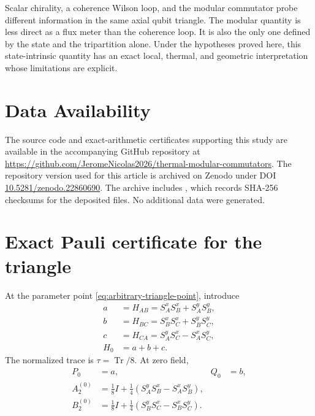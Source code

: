 \documentclass[11pt]{article}
\newcommand{\Tr}{\operatorname{Tr}}
\begin{document}
Scalar chirality, a coherence Wilson loop, and the modular commutator probe
different information in the same axial qubit triangle.  The modular quantity
is less direct as a flux meter than the coherence loop.  It is also the only
one defined by the state and the tripartition alone.  Under the hypotheses
proved here,
this state-intrinsic quantity has an exact local, thermal, and geometric
interpretation whose limitations are explicit.

\section*{Data Availability}

The source code and exact-arithmetic certificates supporting this study are
available in the accompanying GitHub repository at
\url{https://github.com/JeromeNicolas2026/thermal-modular-commutators}.
The repository version used for this article is archived on Zenodo under DOI
\href{https://doi.org/10.5281/zenodo.22860690}{10.5281/zenodo.22860690}.
The archive includes
, which records SHA-256 checksums for the deposited
files.  No additional data were generated.

\appendix

\section{Exact Pauli certificate for the triangle}
\label{app:pauli-certificate}

At the parameter point \eqref{eq:arbitrary-triangle-point}, introduce
\begin{align}
 a&=H_{AB}=S_A^xS_B^x+S_A^yS_B^y,
 \label{eq:a-def}\\
 b&=H_{BC}=S_B^xS_C^x+S_B^yS_C^y,
 \label{eq:b-def}\\
 c&=H_{CA}=S_A^yS_C^x-S_A^xS_C^y,
 \label{eq:c-def}\\
 H_0&=a+b+c.
 \label{eq:H0-def}
\end{align}
The normalized trace is $\tau=\Tr/8$.  At zero field,
\begin{align}
 P_0&=a,
 &Q_0&=b,
 \label{eq:P0Q0}\\
 A_2^{(0)}
 &=\frac18I+\frac14(S_A^yS_B^x-S_A^xS_B^y),
 \label{eq:A20}\\
 B_2^{(0)}
 &=\frac18I+\frac14(S_B^yS_C^x-S_B^xS_C^y).
 \label{eq:B20}
\end{align}
\end{document}
